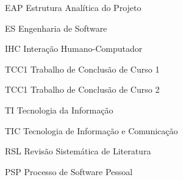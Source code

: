 \begin{siglas}
  \item[EAP] Estrutura Analítica do Projeto
  \item[ES] Engenharia de Software
  \item[IHC] Interação Humano-Computador
  \item[TCC1] Trabalho de Conclusão de Curso 1
  \item[TCC1] Trabalho de Conclusão de Curso 2
  \item[TI] Tecnologia da Informação
  \item[TIC] Tecnologia de Informação e Comunicação
  \item[RSL] Revisão Sistemática de Literatura
  \item[PSP] Processo de Software Pessoal

\end{siglas}
